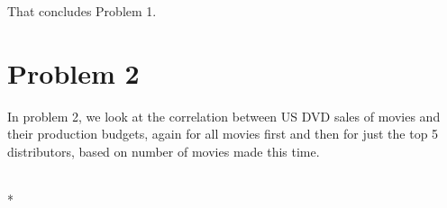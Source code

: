 \documentclass[letterpaper,10pt,english]{/usr/local/lib/python2.7/dist-packages/sphinx/texinputs/sphinxhowto}
\def\smaller{\fontsize{9.5pt}{9.5pt}\selectfont}
\begin{document}
        
    
That concludes Problem 1.\section{Problem 2}In problem 2, we look at the correlation between US DVD sales of movies
and their production budgets, again for all movies first and then for
just the top 5 distributors, based on number of movies made this time.


    
        \vspace{6pt}
        \makebox[0.1\linewidth]{\smaller\hfill\tt\color{nbframe-in-prompt}In\hspace{4pt}{[}12{]}:\hspace{4pt}}\\*
        \vspace{-2.65\baselineskip}
\end{document}
